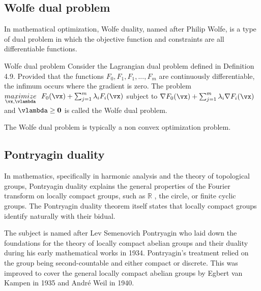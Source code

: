 \documentclass[a4paper,11pt]{article}
\begin{document}
\subsection{Wolfe dual problem}
In mathematical optimization, Wolfe duality, named after Philip Wolfe, is a type of dual problem in which the objective function and constraints are all differentiable functions.\newline
\begin{definition}
Wolfe dual problem \newline \newline
Consider the Lagrangian dual problem defined in Definition 4.9.\newline
Provided that the functions $F_0,F_1,F_1,...,F_m$ are continuously differentiable, the infimum occurs where the gradient is zero.
The problem \newline \newline
\( \underset{\vx,\vlambda}{maximize}\,\,\,\,F_0(\vx) + \sum_{j=1}^{m} \lambda_iF_i(\vx) \) \newline \newline
 subject to \(\nabla F_0(\vx) + \sum_{j=1}^{m} \lambda_i\nabla F_i(\vx) \) and $\vlambda \geq \vzero$ \newline \newline
is called the Wolfe dual problem.
\cite{chap3}
\end{definition}
\begin{remark}
The Wolfe dual problem is typically a non convex optimization problem.
\end{remark}

\subsection{Pontryagin duality}
In mathematics, specifically in harmonic analysis and the theory of topological groups, Pontryagin duality explains the general properties of the Fourier transform on locally compact groups, such as $\mathbb {R}$ , the circle, or finite cyclic groups. The Pontryagin duality theorem itself states that locally compact groups identify naturally with their bidual.

The subject is named after Lev Semenovich Pontryagin who laid down the foundations for the theory of locally compact abelian groups and their duality during his early mathematical works in 1934. Pontryagin's treatment relied on the group being second-countable and either compact or discrete. This was improved to cover the general locally compact abelian groups by Egbert van Kampen in 1935 and André Weil in 1940.
\cite{wiki:003}



\end{document}
